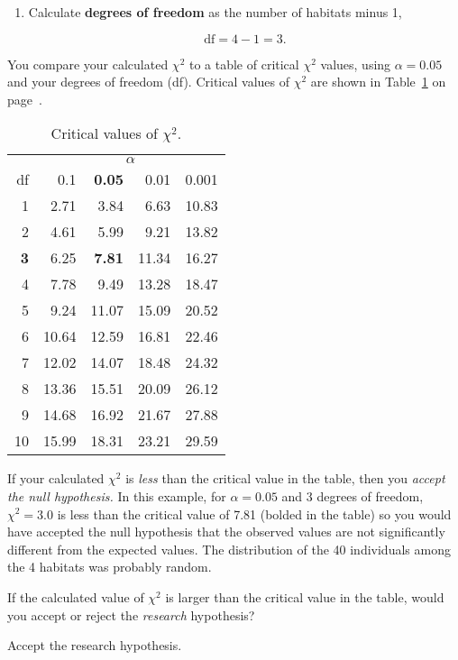 \documentclass[12pt, hidelinks]{exam}
\newcommand*\AnswerBox[2]{%
    \parbox[t][#1]{0.92\textwidth}{%
    \begin{solution}#2\end{solution}}
    \vspace{\stretch{1}}
}
\newlength{\basespace}
\newcommand\chisq{$\chi^2$}
\begin{document}
\begin{questions}
\begin{enumerate}
	\item Calculate \textbf{degrees of freedom} as the number of habitats minus 1,
	
	\[ \mathrm{df} = 4 - 1 = 3.\]

\end{enumerate}

\setcounter{table}{0}
You compare your calculated \chisq{} to a table of critical \chisq{} values, using $\alpha=0.05$ and your degrees of freedom (df). Critical values of \chisq{} are shown in Table~\ref{tab:chi_table} on page~\pageref{tab:chi_table}.

\newpage


{\setlength{\LTcapwidth}{2.2in}\liningnum
\begin{longtable}{@{}rrrrr@{}}
	\caption{Critical values of $\chi^2$.\label{tab:chi_table}} \tabularnewline
\toprule
 & \multicolumn{4}{c}{$\alpha$} \tabularnewline
 \cmidrule(l){2-5}
df & 0.1 & \textbf{0.05} & 0.01 & 0.001 \tabularnewline
\midrule
 1 &  2.71 &  3.84 &  6.63 & 10.83 \tabularnewline
 2 &  4.61 &  5.99 &  9.21 & 13.82 \tabularnewline
\textbf{3} &  6.25 &  \textbf{7.81} & 11.34 & 16.27 \tabularnewline
 4 &  7.78 &  9.49 & 13.28 & 18.47 \tabularnewline
 5 &  9.24 & 11.07 & 15.09 & 20.52 \tabularnewline
 6 & 10.64 & 12.59 & 16.81 & 22.46 \tabularnewline
 7 & 12.02 & 14.07 & 18.48 & 24.32 \tabularnewline
 8 & 13.36 & 15.51 & 20.09 & 26.12 \tabularnewline
 9 & 14.68 & 16.92 & 21.67 & 27.88 \tabularnewline
10 & 15.99 & 18.31 & 23.21 & 29.59 \tabularnewline
\bottomrule
\end{longtable}}


If your calculated \chisq{} is \emph{less} than the critical value in the table, then you \emph{accept the null hypothesis.} In this example, for $\alpha=0.05$ and 3 degrees of freedom, $\chi^2 = 3.0$ is less than the critical value of 7.81 (bolded in the table) so you would have accepted the null hypothesis that the observed values are not significantly different from the expected values. The distribution of the 40 individuals among the 4 habitats was probably random.
	
	\question
	If the calculated value of \chisq{} is larger than the critical value in the table, would you accept or reject the \emph{research} hypothesis?
	
	\AnswerBox{0.5\basespace}{Accept the research hypothesis.}
	

\end{questions}
\end{document}
